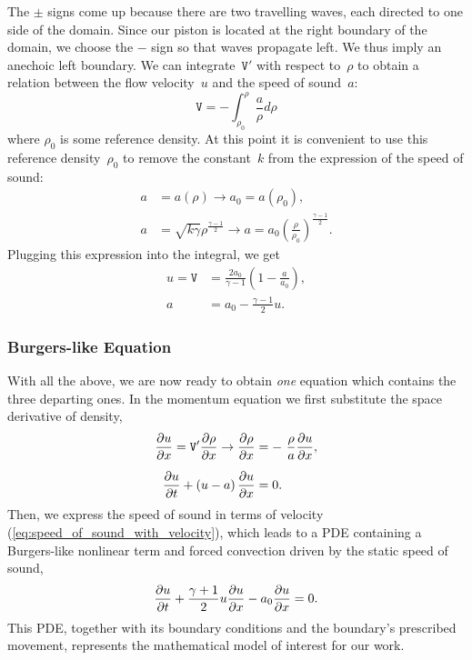 \documentclass[../../thesis.tex]{subfiles}
\begin{document}
The $\pm$ signs come up because there are two travelling waves, 
each directed to one side of the domain.
Since our piston is located at the right boundary of the domain, 
we choose the $-$ sign so that waves propagate left.
We thus imply an anechoic left boundary.
We can integrate~$\mathtt{V}'$ with respect to~$\rho$ to obtain a relation between the flow velocity~$u$ and the speed of sound~$a$:
\begin{equation}
    \mathtt{V} = - \int_{\rho_0}^{\rho} \frac{a}{\rho} d\rho 
\end{equation}
where $\rho_0$ is some reference density.
At this point it is convenient to use this reference density~$\rho_0$ to remove the constant~$k$ from the expression of the speed of sound:
\begin{subequations}
    \begin{align}
        a &= a(\rho) 
        \rightarrow 
        a_0 = a(\rho_0),
        \\
        a &= \sqrt{k \gamma} \rho^{\frac{\gamma-1}{2}} 
        \rightarrow
        a = a_0 \left(\frac{\rho}{\rho_0}\right)^{\frac{\gamma-1}{2}}.
    \end{align}    
\end{subequations}
Plugging this expression into the integral, we get
\begin{subequations}
    \begin{align}
        u = \mathtt{V} &= \frac{2a_0}{\gamma-1}\left(1 - \frac{a}{a_0}\right),
        \\[2mm]
        a &= a_0 - \frac{\gamma-1}{2}u. \label{eq:speed_of_sound_with_velocity}
    \end{align}
\end{subequations}

\subsubsection{Burgers-like Equation}
With all the above, we are now ready to obtain \textit{one} equation which contains the three departing ones.
In the momentum equation we first substitute the space derivative of density,
\begin{subequations}
    \begin{align}
        \pdv{u}{x} = \mathtt{V}' \pdv{\rho}{x} \rightarrow \pdv{\rho}{x} &= - \frac{\rho}{a} \pdv{u}{x},
        \\[2mm]
        \pdv{u}{t} + \left(u-a\right)\pdv{u}{x} &= 0.
    \end{align}    
\end{subequations}
Then, we express the speed of sound in terms of velocity (\ref{eq:speed_of_sound_with_velocity}),
which leads to a PDE containing a Burgers-like nonlinear term and 
forced convection driven by the static speed of sound, 
\begin{equation}
    \pdv{u}{t} + \frac{\gamma+1}{2}u \pdv{u}{x} - a_0\pdv{u}{x} = 0.
\end{equation}
This PDE, together with its boundary conditions and the boundary's prescribed movement, represents the mathematical model of interest for our work. 
\end{document}
